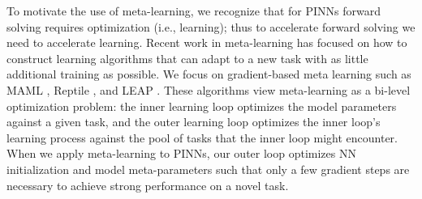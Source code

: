 

To motivate the use of meta-learning, we recognize that for PINNs forward solving requires optimization (i.e., learning); thus to accelerate forward solving we need to accelerate learning. 
Recent work in meta-learning has focused on how to construct learning algorithms that can adapt to a new task with as little additional training as possible.
We focus on gradient-based meta learning such as MAML \citep{finn2017model}, Reptile \citep{nichol2018first}, and LEAP \citep{flennerhag2018transferring}. These algorithms view meta-learning as a bi-level optimization problem: the inner learning loop optimizes the model parameters against a given task, and the outer learning loop optimizes the inner loop's learning process against the pool of tasks that the inner loop might encounter. When we apply meta-learning to PINNs, our outer loop optimizes NN initialization and model meta-parameters such that only a few gradient steps are necessary to achieve strong performance on a novel task.

